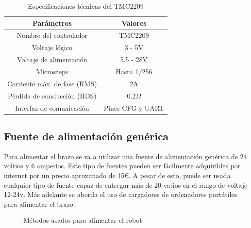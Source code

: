 \begin{table}[H]
\begin{center}
\begin{tabular}{|c|c|}
\hline
\textbf{Parámetros} & \textbf{Valores} \\
\hline
Nombre del controlador & TMC2209 \\
Voltaje lógico & 3 - 5V \\
Voltaje de alimentación & 5.5 - 28V \\
Microsteps & Hasta 1/256 \\
Corriente máx. de fase (RMS) & 2A \\
Pérdida de conducción (RDS) & 0.2$\Omega$ \\
Interfaz de comunicación & Pines CFG y UART \\
\hline
\end{tabular}
\caption{Especificaciones técnicas del TMC2209}
\label{cuadro:ejemplo}
\end{center}
\end{table}
    
\newpage
\subsection{Fuente de alimentación genérica}
\label{subsec:fuente_alimentacion}
Para alimentar el brazo se va a utilizar una fuente de alimentación genérica de 24 voltios y 6 amperios. Este tipo de fuentes pueden ser 
fácilmente adquiribles por internet por un precio aproximado de 15\euro. A pesar de esto, puede ser usada cualquier tipo de fuente capaz de 
entregar más de 20 vatios en el rango de voltaje 12-24v. Más adelante se aborda el uso de cargadores de ordenadores portátiles para alimentar el 
brazo.

\begin{figure} [h!]
  \centering    
  \hspace{3cm}
  \caption{Métodos usados para alimentar el robot}
\end{figure}



